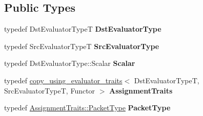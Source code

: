 \subsection*{Public Types}
\begin{DoxyCompactItemize}
\item 
\mbox{\label{class_eigen_1_1internal_1_1generic__dense__assignment__kernel_a561ba921c2fd4cf20ee8304fec07d362}} 
typedef Dst\+Evaluator\+TypeT {\bfseries Dst\+Evaluator\+Type}
\item 
\mbox{\label{class_eigen_1_1internal_1_1generic__dense__assignment__kernel_a7e8f332a10f727ff2487720b8001c877}} 
typedef Src\+Evaluator\+TypeT {\bfseries Src\+Evaluator\+Type}
\item 
\mbox{\label{class_eigen_1_1internal_1_1generic__dense__assignment__kernel_afc39f4324a65c5fa84a2fa40b4eeab61}} 
typedef Dst\+Evaluator\+Type\+::\+Scalar {\bfseries Scalar}
\item 
\mbox{\label{class_eigen_1_1internal_1_1generic__dense__assignment__kernel_aaf95b3cd399443d4d6bcb397c2db3dc1}} 
typedef \mbox{\hyperlink{struct_eigen_1_1internal_1_1copy__using__evaluator__traits}{copy\+\_\+using\+\_\+evaluator\+\_\+traits}}$<$ Dst\+Evaluator\+TypeT, Src\+Evaluator\+TypeT, Functor $>$ {\bfseries Assignment\+Traits}
\item 
\mbox{\label{class_eigen_1_1internal_1_1generic__dense__assignment__kernel_a5eb38ddec89edaeba68915596584bd90}} 
typedef \mbox{\hyperlink{struct_eigen_1_1internal_1_1true__type}{Assignment\+Traits\+::\+Packet\+Type}} {\bfseries Packet\+Type}
\end{DoxyCompactItemize}
